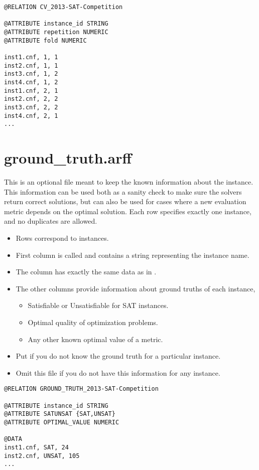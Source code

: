 \begin{lstlisting}[caption=Example cv.arff for two times a $2$-fold cross validation]
@RELATION CV_2013-SAT-Competition

@ATTRIBUTE instance_id STRING
@ATTRIBUTE repetition NUMERIC
@ATTRIBUTE fold NUMERIC

inst1.cnf, 1, 1
inst2.cnf, 1, 1
inst3.cnf, 1, 2
inst4.cnf, 1, 2
inst1.cnf, 2, 1
inst2.cnf, 2, 2
inst3.cnf, 2, 2
inst4.cnf, 2, 1
...
\end{lstlisting}


\section{ground\_truth.arff}

This is an optional file meant to keep the known information about the instance. This information can be 
used both as a sanity check to make sure the solvers return correct solutions, but can also be used for
cases where a new evaluation metric depends on the optimal solution. Each row specifies exactly one
instance, and no duplicates are allowed.

\begin{itemize}
  	\item Rows correspond to instances.
  	\item First column is called  and contains a string representing the instance name.
 	\item The  column has exactly the same data as in .
	\item The other columns provide information about ground truths of each instance, \eg{}
  		\begin{itemize}
    			\item Satisfiable or Unsatisfiable for SAT instances.
    			\item Optimal quality of optimization problems.
			\item Any other known optimal value of a metric.
  		\end{itemize}
  	\item Put \qm if you do not know the ground truth for a particular instance.
  	\item Omit this file if you do not have this information for any instance.
\end{itemize}

\begin{lstlisting}[caption=Example ground\_truth.arff]
@RELATION GROUND_TRUTH_2013-SAT-Competition

@ATTRIBUTE instance_id STRING
@ATTRIBUTE SATUNSAT {SAT,UNSAT}
@ATTRIBUTE OPTIMAL_VALUE NUMERIC

@DATA
inst1.cnf, SAT, 24
inst2.cnf, UNSAT, 105
...
\end{lstlisting}



